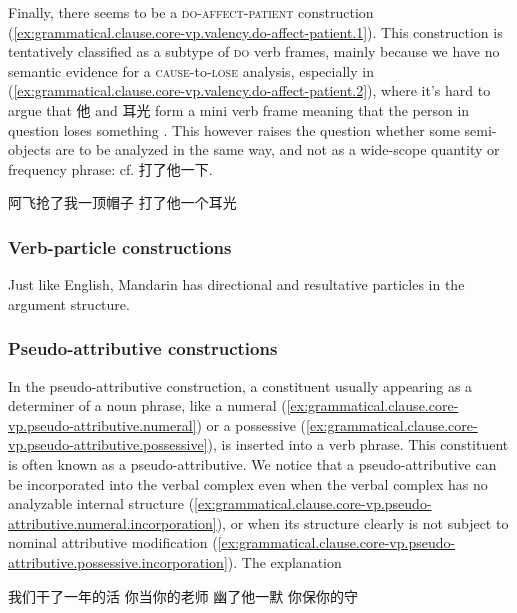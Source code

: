 \documentclass[UTF8, a4paper, oneside, scheme=plain, 12pt]{ctexrep}
\newcommand*{\category}[1]{\textsc{#1}}
\begin{document}
Finally, there seems to be a \category{do}-\category{affect}-\category{patient} construction
(\ref{ex:grammatical.clause.core-vp.valency.do-affect-patient.1}).
This construction is tentatively classified as a subtype of \category{do} verb frames,
mainly because we have no semantic evidence for a \category{cause}-to-\category{lose} analysis,
especially in (\ref{ex:grammatical.clause.core-vp.valency.do-affect-patient.2}),
where it's hard to argue that 他 and 耳光 form a mini verb frame meaning that the person in question loses something
\citep{huang2007}.
This however raises the question whether some semi-objects are to be analyzed in the same way,
and not as a wide-scope quantity or frequency phrase: cf. 打了他一下.

\begin{exe}
    \ex\label{ex:grammatical.clause.core-vp.valency.do-affect-patient.1} 阿飞抢了我一顶帽子
    \ex\label{ex:grammatical.clause.core-vp.valency.do-affect-patient.2} 打了他一个耳光
\end{exe}

\subsubsection{Verb-particle constructions}

Just like English, Mandarin has directional and resultative particles in the argument structure.

\subsubsection{Pseudo-attributive constructions}\label{sec:grammatical.clause.core-vp.pseudo-attributive}

In the pseudo-attributive construction,
a constituent usually appearing as a determiner of a noun phrase, 
like a numeral (\ref{ex:grammatical.clause.core-vp.pseudo-attributive.numeral})
or a possessive (\ref{ex:grammatical.clause.core-vp.pseudo-attributive.possessive}),
is inserted into a verb phrase.
This constituent is often known as a pseudo-attributive.
We notice that a pseudo-attributive can be incorporated into the verbal complex
even when the verbal complex has no analyzable internal structure
(\ref{ex:grammatical.clause.core-vp.pseudo-attributive.numeral.incorporation}),
or when its structure clearly is not subject to nominal attributive modification
(\ref{ex:grammatical.clause.core-vp.pseudo-attributive.possessive.incorporation}).
The explanation 

\begin{exe}
    \ex\label{ex:grammatical.clause.core-vp.pseudo-attributive.numeral} 我们干了一年的活
    \ex\label{ex:grammatical.clause.core-vp.pseudo-attributive.possessive} 你当你的老师
    \ex\label{ex:grammatical.clause.core-vp.pseudo-attributive.numeral.incorporation} 幽了他一默
    \ex\label{ex:grammatical.clause.core-vp.pseudo-attributive.possessive.incorporation} 你保你的守
\end{exe}
\end{document}

